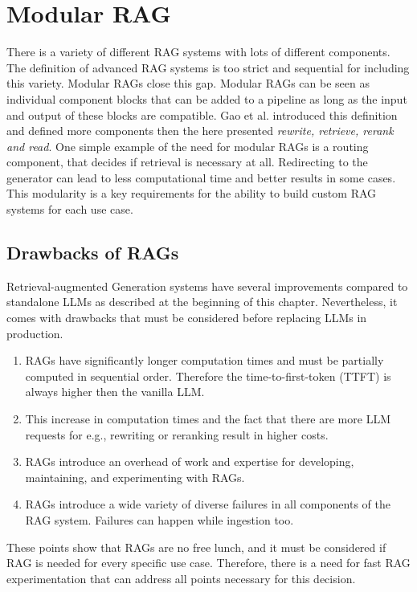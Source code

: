 \section{Modular RAG}

There is a variety of different RAG systems with lots of different components. The definition of advanced RAG systems is too strict and sequential for including this variety. Modular RAGs close this gap. Modular RAGs can be seen as individual component blocks that can be added to a pipeline as long as the input and output of these blocks are compatible. Gao et al. introduced this definition and defined more components then the here presented \textit{rewrite, retrieve, rerank and read}.\cite{Gao.18.12.2023} One simple example of the need for modular RAGs is a routing component, that decides if retrieval is necessary at all. Redirecting to the generator can lead to less computational time and better results in some cases.\cite{Mallen.2022} This modularity is a key requirements for the ability to build custom RAG systems for each use case.


\subsection{Drawbacks of RAGs}
\label{sec:drawbacks}
Retrieval-augmented Generation systems have several improvements compared to standalone LLMs as described at the beginning of this chapter. Nevertheless, it comes with drawbacks that must be considered before replacing LLMs in production.

\begin{enumerate}
    \item RAGs have significantly longer computation times and must be partially computed in sequential order. Therefore the time-to-first-token (TTFT) is always higher then the vanilla LLM.
    \item This increase in computation times and the fact that there are more LLM requests for e.g., rewriting or reranking result in higher costs.
    \item RAGs introduce an overhead of work and expertise for developing, maintaining, and experimenting with RAGs.
    \item RAGs introduce a wide variety of diverse failures in all components of the RAG system. Failures can happen while ingestion too.
\end{enumerate}

These points show that RAGs are no free lunch, and it must be considered if RAG is needed for every specific use case. Therefore, there is a need for fast RAG experimentation that can address all points necessary for this decision.
